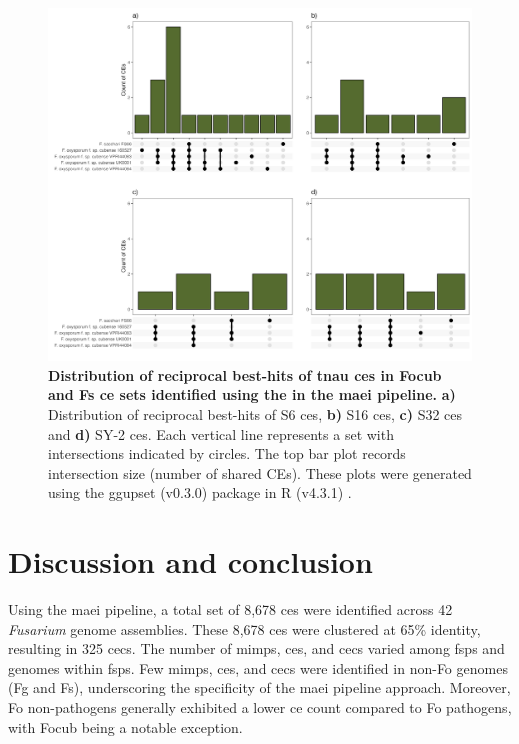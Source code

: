 \begin{figure}[hp!]
    \centering
    \includegraphics[width=\textwidth]{Figures/UpSetPlots.png}
    \caption[Distribution of reciprocal best-hits of \ac{tnau} \acp{ce}  in \ac{Focub} and \ac{Fs} \ac{ce} sets identified using the in the \ac{maei} pipeline.]{\textbf{Distribution of reciprocal best-hits of \ac{tnau} \acp{ce} in \ac{Focub} and \ac{Fs} \ac{ce} sets identified using the in the \ac{maei} pipeline.} \textbf{a)} Distribution of reciprocal best-hits of S6 \acp{ce}, \textbf{b)} S16 \acp{ce}, \textbf{c)} S32 \acp{ce} and \textbf{d)} SY-2 \acp{ce}. Each vertical line represents a set with intersections indicated by circles. The top bar plot records intersection size (number of shared CEs). These plots were generated using the ggupset (v0.3.0) \parencite{ggupset} package in R (v4.3.1) \parencite{R}.}
    \label{fig:RBHupsets}
\end{figure}

\clearpage
\section{Discussion and conclusion}

Using the \ac{maei} pipeline, a total set of 8,678 \acp{ce} were identified across 42 \textit{Fusarium} genome assemblies. These 8,678 \acp{ce} were clustered at 65\% identity, resulting in 325 \acfp{cec}. The number of \acp{mimp}, \acp{ce}, and \acp{cec} varied among \acp{fsp} and genomes within \acp{fsp}. Few \acp{mimp}, \acp{ce}, and \acp{cec} were identified in non-\ac{Fo} genomes (\acl{Fg} and \acl{Fs}), underscoring the specificity of the \ac{maei} pipeline approach. Moreover, \ac{Fo} non-pathogens generally exhibited a lower \ac{ce} count compared to \ac{Fo} pathogens, with \ac{Focub} being a notable exception.

